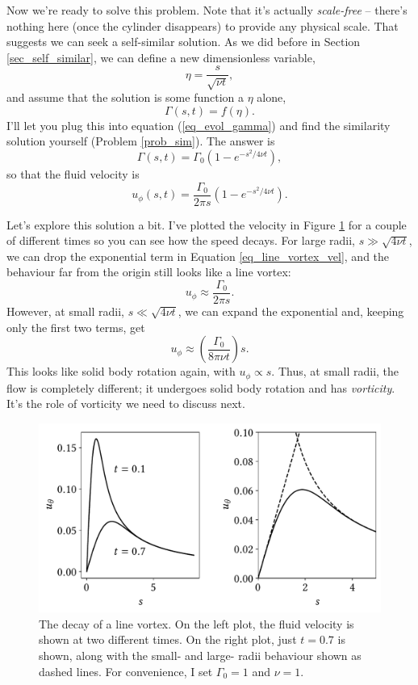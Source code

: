 Now we're ready to solve this problem.  Note that it's actually \emph{scale-free} -- there's nothing here (once the cylinder disappears) to provide any physical scale.  That suggests we can seek a self-similar solution. As we did before in Section \ref{sec_self_similar}, we can define a new dimensionless variable,
\begin{equation}
\eta = \frac{s}{\sqrt{\nu t}},
\end{equation}
and assume that the solution is some function a $\eta$ alone,
\[
\Gamma(s, t) = f(\eta).
\]
I'll let you plug this into equation (\ref{eq_evol_gamma}) and find the similarity solution yourself (Problem \ref{prob_sim}).  The answer is
\[
\Gamma(s, t) = \Gamma_0 \left(1 - e^{-s^2 / 4\nu t} \right),
\]
so that the fluid velocity is
\begin{equation}
\label{eq_line_vortex_vel}
u_\phi(s, t) = \frac{\Gamma_0}{2\pi s} \left( 1- e^{-s^2 / 4 \nu t} \right).
\end{equation}

Let's explore this solution a bit.  I've plotted the velocity in Figure \ref{fig_line_vortex} for a couple of different times so you can see how the speed decays.  For large radii, $s \gg \sqrt{4\nu t}$, we can drop the exponential term in Equation \ref{eq_line_vortex_vel}, and the behaviour far from the origin still looks like a line vortex:
\[
u_\phi \approx \frac{\Gamma_0}{2\pi s}.
\]
However, at small radii, $s \ll \sqrt{4 \nu t}$, we can expand the exponential and, keeping only the first two terms, get
\[
u_\phi \approx \left( \frac{\Gamma_0}{8 \pi \nu t} \right) s.
\]
This looks like solid body rotation again, with $u_\phi \propto s$.  Thus, at small radii, the flow is completely different; it undergoes solid body rotation and has \emph{vorticity}.  It's the role of vorticity we need to discuss next.

\begin{figure}
\centering
\includegraphics[width=0.8\linewidth]{Figures/Chapter2/fig_line_vortex}
\caption{The decay of a line vortex.  On the left plot, the fluid velocity is shown at two different times.  On the right plot, just $t=0.7$ is shown, along with the small- and large- radii behaviour shown as dashed lines. For convenience, I set $\Gamma_0 = 1$ and $\nu = 1$.}
\label{fig_line_vortex}
\end{figure}

